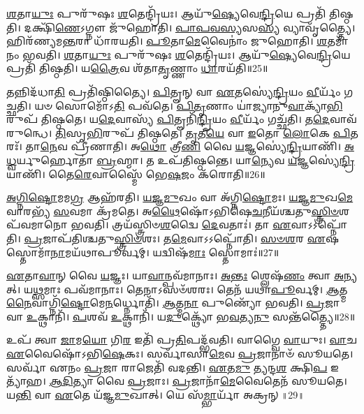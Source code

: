 \-\ul{𑌶}\-𑌤𑌾\-\ul{𑌯𑍁𑌃} 𑌪𑍁𑌰𑍁᳴𑌷𑌃 \ul{𑌶}\-𑌤𑍇𑌨𑍍𑌦𑍍𑌰𑌿᳴𑌯𑌃।
𑌆𑌯𑍁᳴\-\ul{𑌷𑍍𑌯𑍇}\-𑌵𑍇\-\ul{𑌨𑍍𑌦𑍍𑌰𑌿}\-𑌯𑍇 𑌪𑍍𑌰𑌤𑌿᳴ 𑌤𑌿𑌷𑍍𑌠𑌤𑌿।
𑌦𑌕𑍍𑌷𑌿᳴\-\ul{𑌣𑍇}\-\-𑌽𑌗𑍍𑌨𑍗 𑌜𑍁᳴𑌹𑍋𑌤𑌿।
\-\ul{𑌪𑌾}\-\-\ul{𑌪}\-\-\ul{𑌵}\-\-\ul{𑌸𑍍𑌯}\-𑌸\-\ul{𑌸𑍍𑌯} 𑌵𑍍𑌯𑌾𑌵𑍃᳴𑌤𑍍𑌤𑍍𑌯𑍈।
𑌹𑌿𑌰᳴𑌣𑍍𑌯𑌮\-\ul{𑌨𑍍𑌤}\-𑌰𑌾 𑌧𑌾᳴𑌰𑌯𑌤𑌿।
\-\ul{𑌪𑍂}\-𑌤𑌾\-\ul{𑌮𑍇}\-𑌵𑍈𑌨𑌾𑌂॑ 𑌜𑍁𑌹𑍋𑌤𑌿।
\-\ul{𑌶}\-𑌤𑌮𑌾᳴𑌨𑌂 𑌭𑌵𑌤𑌿।
\-\ul{𑌶}\-𑌤𑌾\-\ul{𑌯𑍁𑌃} 𑌪𑍁𑌰𑍁᳴𑌷𑌃 \ul{𑌶}\-𑌤𑍇𑌨𑍍𑌦𑍍𑌰𑌿᳴𑌯𑌃।
𑌆𑌯𑍁᳴\-\ul{𑌷𑍍𑌯𑍇}\-𑌵𑍇\-\ul{𑌨𑍍𑌦𑍍𑌰𑌿}\-𑌯𑍇 𑌪𑍍𑌰𑌤𑌿᳴ 𑌤𑌿𑌷𑍍𑌠𑌤𑌿।
𑌯\-\ul{𑌤𑍍𑌰𑍈}\-𑌵 𑌶᳴𑌤𑌾\-\ul{𑌤𑍃}\-𑌣𑍍𑌣𑌾𑌂 \ul{𑌧𑌾}\-𑌰𑌯᳴𑌤𑌿॥25॥

𑌤𑌨𑍍𑌨𑌿𑌦᳴𑌧𑌾\-\ul{𑌤𑌿} 𑌪𑍍𑌰𑌤𑌿᳴\-𑌷𑍍𑌠𑌿𑌤𑍍𑌯𑍈।
\-\ul{𑌪𑌿}\-𑌤𑍄𑌨𑍍 𑌵𑌾 \ul{𑌏}\-𑌤𑌸𑍍𑌯𑍇॑\-\ul{𑌨𑍍𑌦𑍍𑌰𑌿}\-𑌯𑌂 \ul{𑌵𑍀}\-𑌰𑍍𑌯𑌂᳴ 𑌗𑌚𑍍𑌛𑌤𑌿।
𑌯𑍞 𑌸𑍋𑌮𑍋᳴𑌽\-\ul{𑌤𑌿} 𑌪𑌵᳴𑌤𑍇।
\-\ul{𑌪𑌿}\-\-\ul{𑌤𑍃}\-𑌣𑌾𑌂 𑌯𑌾॑𑌜𑍍𑌯𑌾𑌨𑍁\-\ul{𑌵𑌾}\-𑌕𑍍𑌯𑌾᳴\-\ul{𑌭𑌿}\-𑌰𑍁𑌪᳴ 𑌤𑌿𑌷𑍍𑌠𑌤𑍇।
𑌯\-\ul{𑌦𑍇}\-𑌵𑌾𑌸𑍍𑌯᳴ \ul{𑌪𑌿}\-𑌤𑍄𑌨𑌿᳴\-\ul{𑌨𑍍𑌦𑍍𑌰𑌿}\-𑌯𑌂 \ul{𑌵𑍀}\-𑌰𑍍𑌯𑌂᳴ 𑌗𑌚𑍍𑌛᳴𑌤𑌿।
𑌤\-\ul{𑌦𑍇}\-𑌵𑌾𑌵᳴ 𑌰𑍁𑌨𑍍𑌧𑍇।
\-\ul{𑌤𑌿}\-𑌸𑍃\-\ul{𑌭𑌿}\-𑌰𑍁𑌪᳴ 𑌤𑌿𑌷𑍍𑌠𑌤𑍇।
\-\ul{𑌤𑍃}\-𑌤𑍀\-\ul{𑌯𑍇} 𑌵𑌾 \ul{𑌇}\-𑌤𑍋 \ul{𑌲𑍋}\-𑌕𑍇 \ul{𑌪𑌿}\-𑌤𑌰𑌃᳴।
𑌤𑌾\-\ul{𑌨𑍇}\-𑌵 𑌪𑍍𑌰𑍀᳴𑌣𑌾𑌤𑌿।
𑌅\-\ul{𑌥𑍋} 𑌤𑍍𑌰𑍀\-\ul{𑌣𑌿} 𑌵𑍈 \ul{𑌯}\-𑌜𑍍𑌞𑌸𑍍𑌯𑍇॑\-\ul{𑌨𑍍𑌦𑍍𑌰𑌿}\-𑌯𑌾𑌣𑌿᳴।
\-\ul{𑌅}\-\-\ul{𑌧𑍍𑌵}\-𑌰𑍍𑌯𑍁𑌰𑍍\mbox{}𑌹𑍋𑌤𑌾॑ \ul{𑌬𑍍𑌰}\-𑌹𑍍𑌮𑌾।
𑌤 𑌉𑌪᳴𑌤𑌿𑌷𑍍𑌠𑌨𑍍𑌤𑍇।
𑌯𑌾\-\ul{𑌨𑍍𑌯𑍇}\-𑌵 \ul{𑌯}\-𑌜𑍍𑌞𑌸𑍍𑌯𑍇॑\-\ul{𑌨𑍍𑌦𑍍𑌰𑌿}\-𑌯𑌾𑌣𑌿᳴।
𑌤𑍈\-\ul{𑌰𑍇}\-𑌵𑌾𑌸𑍍𑌮𑍈᳴ 𑌭𑍇\-\ul{𑌷}\-𑌜𑌂 𑌕᳴𑌰𑍋𑌤𑌿॥26॥\anuvakamend[\-\ul{𑌪𑍍𑌰𑍀}\-\-\ul{𑌣𑌾}\-\-\ul{𑌤𑌿} \ul{𑌪𑍍𑌰}\-\-\ul{𑌥}\-𑌮𑍋 𑌦𑌕𑍍𑌷𑌿᳴𑌣𑌾 \ul{𑌸}\-𑌮𑌵᳴𑌨𑌯𑌤𑌿 \ul{𑌧𑌾}\-𑌰𑌯᳴𑌤𑍀\-\ul{𑌨𑍍𑌦𑍍𑌰𑌿}\-𑌯𑌾𑌣𑌿᳴ \ul{𑌚}\-𑌤𑍍𑌵𑌾𑌰𑌿᳴ 𑌚]

\-\ul{𑌅}\-\-\ul{𑌗𑍍𑌨𑌿}\-\-\ul{𑌷𑍍𑌟𑍋}\-𑌮𑌮\-\ul{𑌗𑍍𑌰} 𑌆𑌹᳴𑌰𑌤𑌿।
\-\ul{𑌯}\-\-\ul{𑌜𑍍𑌞}\-\-\ul{𑌮𑍁}\-𑌖𑌂 𑌵𑌾 𑌅᳴𑌗𑍍𑌨𑌿\-\ul{𑌷𑍍𑌟𑍋}\-𑌮𑌃।
\-\ul{𑌯}\-\-\ul{𑌜𑍍𑌞}\-\-\ul{𑌮𑍁}\-𑌖\-\ul{𑌮𑍇}\-𑌵𑌾𑌰𑌭𑍍𑌯᳴ \ul{𑌸}\-𑌵𑌮𑌾 𑌕𑍍𑌰᳴𑌮𑌤𑍇।
𑌅\-\ul{𑌥𑍈}\-𑌷𑍋᳴\-𑌽𑌭𑌿𑌷𑍇\-\ul{𑌚}\-𑌨𑍀𑌯᳴𑌶𑍍𑌚𑌤𑍁\-\-\ul{𑌸𑍍𑌤𑍍𑌰𑌿}\-\-\ul{𑍞}\-𑌶𑌪᳴𑌵𑌮𑌾𑌨𑍋 𑌭𑌵𑌤𑌿।
𑌤𑍍𑌰𑌯᳴𑌸𑍍𑌤𑍍𑌰𑌿𑍞\-\ul{𑌶}\-𑌦𑍍𑌵𑍈 \ul{𑌦𑍇}\-𑌵𑌤𑌾𑌃॑।
𑌤𑌾 \ul{𑌏}\-𑌵𑌾𑌽𑌽𑌪𑍍𑌨𑍋᳴𑌤𑌿।
\-\ul{𑌪𑍍𑌰}\-𑌜𑌾𑌪᳴𑌤𑌿𑌶𑍍𑌚𑌤𑍁\-\ul{𑌸𑍍𑌤𑍍𑌰𑌿}\-\-\ul{𑍞}\-𑌶𑌃।
𑌤\-\ul{𑌮𑍇}\-𑌵𑌾𑌽𑌽𑌪𑍍𑌨𑍋᳴𑌤𑌿।
\-\ul{𑌸}\-\-\ul{𑍞}\-\-\ul{𑌶}\-𑌰 \ul{𑌏}\-𑌷 𑌸𑍍𑌤𑍋𑌮𑌾᳴\-\ul{𑌨𑌾}\-𑌮𑌯᳴𑌥𑌾\-𑌪𑍂𑌰𑍍𑌵𑌮𑍍।
𑌯𑌦𑍍𑌵𑌿𑌷᳴\-\ul{𑌮𑌾𑌃} 𑌸𑍍𑌤𑍋𑌮𑌾𑌃॑॥27॥

\-\ul{𑌏}\-𑌤𑌾\-\ul{𑌵𑌾}\-𑌨𑍍 𑌵𑍈 \ul{𑌯}\-𑌜𑍍𑌞𑌃।
𑌯𑌾\-\ul{𑌵𑌾}\-𑌨𑍍𑌪𑌵᳴𑌮𑌾𑌨𑌾𑌃।
\-\ul{𑌅}\-\-\ul{𑌨𑍍𑌤𑌃} 𑌶𑍍𑌲𑍇𑌷᳴\-\ul{𑌣𑌂} 𑌤𑍍𑌵𑌾 \ul{𑌅}\-𑌨𑍍𑌯𑌤𑍍।
𑌯\-\ul{𑌥𑍍𑌸}\-𑌮𑌾𑌃 𑌪𑌵᳴𑌮𑌾𑌨𑌾𑌃।
𑌤𑍇𑌨𑌾𑌽𑌸𑍞᳴𑌶𑌰𑌃।
𑌤𑍇𑌨᳴ 𑌯𑌥𑌾\-\ul{𑌪𑍂}\-𑌰𑍍𑌵𑌮𑍍।
\-\ul{𑌆}\-𑌤𑍍𑌮\-\ul{𑌨𑍈}\-𑌵𑌾𑌗𑍍𑌨𑌿᳴\-\ul{𑌷𑍍𑌟𑍋}\-𑌮𑍇\-\ul{𑌨}\-𑌰𑍍𑌧𑍍𑌨𑍋𑌤𑌿᳴।
\-\ul{𑌆}\-𑌤𑍍𑌮\-\ul{𑌨𑌾} 𑌪𑍁𑌣𑍍𑌯𑍋᳴ 𑌭𑌵𑌤𑌿।
\-\ul{𑌪𑍍𑌰}\-𑌜𑌾 𑌵𑌾 \ul{𑌉}\-𑌕𑍍𑌥𑌾𑌨𑌿᳴।
\-\ul{𑌪}\-𑌶𑌵᳴ \ul{𑌉}\-𑌕𑍍𑌥𑌾𑌨𑌿᳴।
𑌯\-\ul{𑌦𑍁}\-𑌕𑍍𑌥𑍍𑌯𑍋᳴ 𑌭\-\ul{𑌵}\-𑌤𑍍𑌯\-\ul{𑌨𑍁} 𑌸𑌨𑍍𑌤᳴𑌤𑍍𑌤𑍍𑌯𑍈॥28॥\anuvakamend[𑌸𑍍𑌤𑍋𑌮𑌾॑: \ul{𑌪}\-𑌶𑌵᳴ \ul{𑌉}\-𑌕𑍍𑌥𑌾𑌨𑍍𑌯𑍇𑌕𑌂᳴ 𑌚]

𑌉𑌪᳴ 𑌤𑍍𑌵𑌾 \ul{𑌜𑌾}\-𑌮\-\ul{𑌯𑍋} 𑌗𑌿\-\ul{𑌰} 𑌇𑌤𑌿᳴ 𑌪𑍍𑌰\-\ul{𑌤𑌿}\-𑌪𑌦𑍍𑌭᳴𑌵𑌤𑌿।
𑌵𑌾𑌗𑍍𑌵𑍈 \ul{𑌵𑌾}\-𑌯𑍁𑌃।
\-\ul{𑌵𑌾}\-𑌚 \ul{𑌏}\-𑌵𑍈𑌷𑍋᳴\-𑌽𑌭𑌿\-\ul{𑌷𑍇}\-𑌕𑌃।
𑌸𑌰𑍍𑌵𑌾᳴𑌸𑌾\-\ul{𑌮𑍇}\-𑌵 \ul{𑌪𑍍𑌰}\-𑌜𑌾𑌨𑌾𑍞᳴ 𑌸𑍂𑌯𑌤𑍇।
𑌸𑌰𑍍𑌵𑌾᳴ 𑌏𑌨𑌂 \ul{𑌪𑍍𑌰}\-𑌜𑌾 𑌰𑌾𑌜𑍇𑌤𑌿᳴ 𑌵𑌦𑌨𑍍𑌤𑌿।
\-\ul{𑌏}\-𑌤\-\ul{𑌮𑍁} 𑌤𑍍𑌯𑌨𑍍𑌦\-\ul{𑌶} 𑌕𑍍𑌷𑌿\-\ul{𑌪} 𑌇𑌤𑍍𑌯𑌾᳴𑌹।
\-\ul{𑌆}\-\-\ul{𑌦𑌿}\-𑌤𑍍𑌯𑌾 𑌵𑍈 \ul{𑌪𑍍𑌰}\-𑌜𑌾𑌃।
\-\ul{𑌪𑍍𑌰}\-𑌜𑌾𑌨𑌾᳴\-\ul{𑌮𑍇}\-𑌵𑍈𑌤𑍇𑌨᳴ 𑌸𑍂𑌯𑌤𑍇।
𑌯\-\ul{𑌨𑍍𑌤𑌿} 𑌵𑌾 \ul{𑌏}\-𑌤𑍇 𑌯᳴𑌜𑍍𑌞\-\ul{𑌮𑍁}\-𑌖𑌾𑌤𑍍।
𑌯𑍇 𑌸᳴\-\ul{𑌮𑍍𑌭𑌾}\-𑌰𑍍𑌯𑌾᳴ 𑌅𑌕𑍍𑌰𑌨𑍍॥29॥

